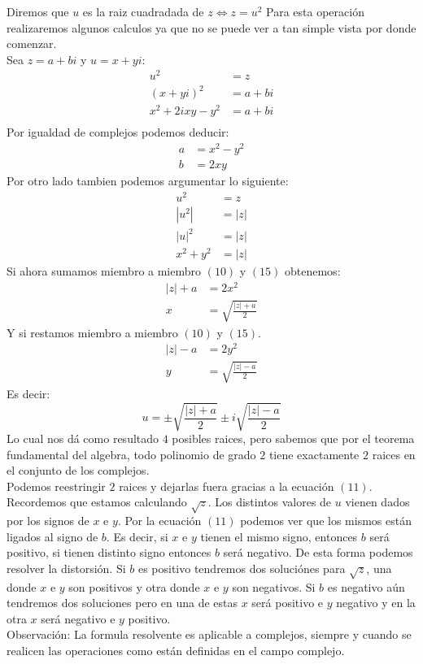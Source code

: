 \documentclass[]{article}
\begin{document}
Diremos que $u$ es la raiz cuadradada de $z \Leftrightarrow z = u^{2}$  
Para esta operación realizaremos algunos calculos ya que no se puede ver a tan simple vista por donde comenzar.
\\
Sea $z = a+bi$ y $u = x + yi$:
\begin{align}
  u^{2}&= z\\
  (x+yi)^{2}&= a+bi\\
 x^{2}+2ixy-y^{2} &=a+bi\\
\end{align}
Por igualdad de complejos podemos deducir:
\begin{align}
  a &= x^{2} - y^{2}\\
  b &=2xy 
\end{align}
Por otro lado tambien podemos argumentar lo siguiente:
\begin{align}
  u^{2}&=z\\
  |u^{2}| &= |z|\\
  |u|^{2} &= |z|\\
  x^{2}+y^{2} &= |z| 
\end{align}
Si ahora sumamos miembro a miembro $(10)$ y $(15)$ obtenemos:
\begin{align}
  |z| + a &= 2x^{2}\\
  x &= \sqrt{\frac{|z|+a}{2}}  
\end{align}
Y si restamos miembro a miembro $(10)$ y $(15)$.
\begin{align}
|z| - a &= 2y^{2}\\
y &= \sqrt{\frac{|z|-a}{2}}  
\end{align}
Es decir: 
$$
u = \pm\sqrt{\frac{|z|+a}{2}}  \pm i\sqrt{\frac{|z|-a}{2}}   
$$
Lo cual nos dá como resultado $4$ posibles raices, pero sabemos que por el teorema fundamental del algebra, todo polinomio de grado $2$ tiene exactamente $2$ raices en el conjunto de los complejos.
\\ 
Podemos reestringir $2$ raices y dejarlas fuera gracias a la ecuación $(11)$. Recordemos que estamos calculando $\sqrt{z}$.
Los distintos valores de $u$ vienen dados por los signos de $x$ e $y$. Por la ecuación $(11)$ podemos ver que los mismos están ligados al signo de $b$. Es decir, si $x$ e $y$ tienen el mismo signo, entonces $b$ será positivo, si tienen distinto signo entonces $b$ será negativo. De esta forma podemos resolver la distorsión. Si $b$ es positivo tendremos dos soluciónes para $\sqrt{z}$, una donde $x$ e $y$ son positivos y otra donde $x$ e $y$ son negativos. Si $b$ es negativo aún tendremos dos soluciones pero en una de estas $x$ será positivo e $y$ negativo y en la otra $x$ será negativo e $y$ positivo.
\\
Observación: La formula resolvente es aplicable a complejos, siempre y cuando se realicen las operaciones como están definidas en el campo complejo.
\\
\end{document}
